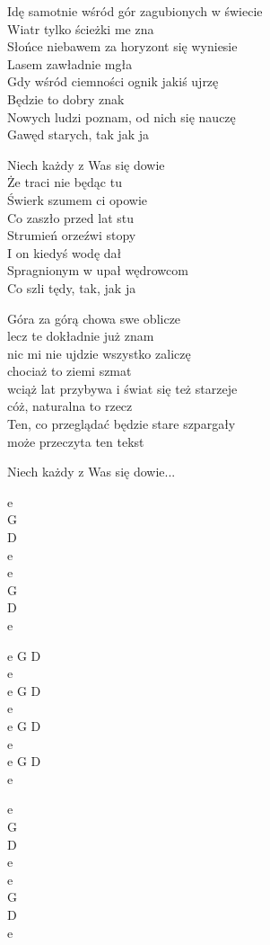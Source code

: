 \begin{text}
    Idę samotnie wśród gór zagubionych w świecie\\
    Wiatr tylko ścieżki me zna\\
    Słońce niebawem za horyzont się wyniesie\\
    Lasem zawładnie mgła\\
    Gdy wśród ciemności ognik jakiś ujrzę\\
    Będzie to dobry znak\\
    Nowych ludzi poznam, od nich się nauczę\\
    Gawęd starych, tak jak ja

    \vin Niech każdy z Was się dowie\\
    \vin Że traci nie będąc tu\\
    \vin Świerk szumem ci opowie\\
    \vin Co zaszło przed lat stu\\
    \vin Strumień orzeźwi stopy\\
    \vin I on kiedyś wodę dał\\
    \vin Spragnionym w upał wędrowcom\\
    \vin Co szli tędy, tak, jak ja

    Góra za górą chowa swe oblicze\\
    lecz te dokładnie już znam\\
    nic mi nie ujdzie wszystko zaliczę\\
    chociaż to ziemi szmat\\
    wciąż lat przybywa i świat się też starzeje\\
    cóż, naturalna to rzecz\\
    Ten, co przeglądać będzie stare szpargały\\
    może przeczyta ten tekst

    \vin Niech każdy z Was się dowie...
\end{text}
\begin{chord}
    e\\ 
    G\\
    D\\
    e\\ 
    e\\ 
    G\\
    D\\
    e

    e G D\\ 
    e \\
    e G D\\ 
    e \\
	e G D\\ 
    e \\
    e G D\\ 
    e 

    e\\ 
    G\\
    D\\
    e\\ 
    e\\ 
    G\\
    D\\
    e
\end{chord}
